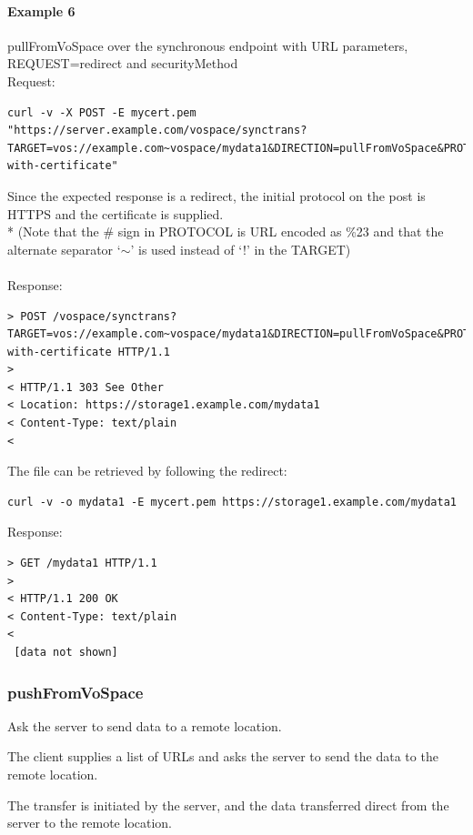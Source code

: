 \documentclass[11pt,a4paper]{ivoa}
\begin{document}
\paragraph{Example 6}
pullFromVoSpace over the synchronous endpoint with URL parameters, REQUEST=redirect and securityMethod
\\[5px]
\noindent
Request:
\begin{lstlisting}
curl -v -X POST -E mycert.pem "https://server.example.com/vospace/synctrans?TARGET=vos://example.com~vospace/mydata1&DIRECTION=pullFromVoSpace&PROTOCOL=ivo://ivoa.net/vospace/core%23httpsget&REQUEST=redirect&SECURITYMETHOD=ivo://ivoa.net/sso%23tls-with-certificate"
\end{lstlisting}
Since the expected response is a redirect, the initial protocol on the post is HTTPS and the certificate is supplied.\\*
(Note that the \# sign in PROTOCOL is URL encoded as \%23 and that the alternate separator `$\mathtt{\sim}$' is used instead of `!' in the TARGET) \\
\\
Response:
\begin{lstlisting}
> POST /vospace/synctrans?TARGET=vos://example.com~vospace/mydata1&DIRECTION=pullFromVoSpace&PROTOCOL=ivo://ivoa.net/vospace/core\%23httpget&REQUEST=redirect&SECURITYMETHOD=ivo://ivoa.net/sso%23tls-with-certificate HTTP/1.1
>
< HTTP/1.1 303 See Other
< Location: https://storage1.example.com/mydata1
< Content-Type: text/plain
<
\end{lstlisting}
The file can be retrieved by following the redirect:
\begin{lstlisting}
curl -v -o mydata1 -E mycert.pem https://storage1.example.com/mydata1
\end{lstlisting}
Response:
\begin{lstlisting}
> GET /mydata1 HTTP/1.1
>
< HTTP/1.1 200 OK
< Content-Type: text/plain
<
 [data not shown]
\end{lstlisting}

\subsubsection{pushFromVoSpace}
\label{subsubsec:pushfromvospace}
Ask the server to send data to a remote location.

The client supplies a list of URLs and asks the server to send the data to the remote location.

The transfer is initiated by the server, and the data transferred direct from the server to the remote location.
\end{document}
